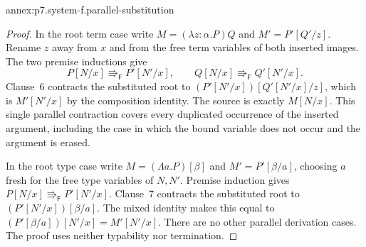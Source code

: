 \begin{annexitem}{annex:p7.system-f.parallel-substitution}
\begin{proof}
In the root term case write \(M=(\lambda z{:}\alpha.P)Q\) and
\(M'=P'[Q'/z]\). Rename \(z\) away from \(x\) and from the free
term variables of both inserted images. The two premise inductions give
\[
 P[N/x]\Rrightarrow_{\mathsf F}P'[N'/x],\qquad
 Q[N/x]\Rrightarrow_{\mathsf F}Q'[N'/x].
\]
Clause~6 contracts the substituted root to
\((P'[N'/x])[Q'[N'/x]/z]\), which is \(M'[N'/x]\) by the
composition identity. The source is exactly \(M[N/x]\).
This single parallel contraction covers every duplicated occurrence of
the inserted argument, including the case in which the bound variable
does not occur and the argument is erased.

In the root type case write \(M=(\Lambda a.P)[\beta]\) and
\(M'=P'[\beta/a]\), choosing \(a\) fresh for the free type variables
of \(N,N'\). Premise induction gives
\(P[N/x]\Rrightarrow_{\mathsf F}P'[N'/x]\). Clause~7 contracts the
substituted root to \((P'[N'/x])[\beta/a]\). The mixed identity makes
this equal to \((P'[\beta/a])[N'/x]=M'[N'/x]\). There are no other
parallel derivation cases. The proof uses neither typability nor termination.
\end{proof}
\end{annexitem}

